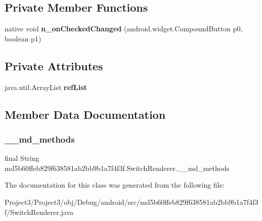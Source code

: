 \subsection*{Private Member Functions}
\begin{DoxyCompactItemize}
\item 
\mbox{\label{classmd5b60ffeb829f638581ab2bb9b1a7f4f3f_1_1SwitchRenderer_a6d1599f163e2b3ba3d0c2223d62e8b34}} 
native void {\bfseries n\+\_\+on\+Checked\+Changed} (android.\+widget.\+Compound\+Button p0, boolean p1)
\end{DoxyCompactItemize}
\subsection*{Private Attributes}
\begin{DoxyCompactItemize}
\item 
\mbox{\label{classmd5b60ffeb829f638581ab2bb9b1a7f4f3f_1_1SwitchRenderer_ad6c93485d20d2c459c3ad2829f699a70}} 
java.\+util.\+Array\+List {\bfseries ref\+List}
\end{DoxyCompactItemize}


\subsection{Member Data Documentation}
\mbox{\label{classmd5b60ffeb829f638581ab2bb9b1a7f4f3f_1_1SwitchRenderer_a5d8d51148704e49b135709f942738f92}} 
\subsubsection{\texorpdfstring{\+\_\+\+\_\+md\+\_\+methods}{\_\_md\_methods}}
{\footnotesize\ttfamily final String md5b60ffeb829f638581ab2bb9b1a7f4f3f.\+Switch\+Renderer.\+\_\+\+\_\+md\+\_\+methods\hspace{0.3cm}{\ttfamily [static]}}



The documentation for this class was generated from the following file\+:\begin{DoxyCompactItemize}
\item 
Project3/\+Project3/obj/\+Debug/android/src/md5b60ffeb829f638581ab2bb9b1a7f4f3f/Switch\+Renderer.\+java\end{DoxyCompactItemize}
